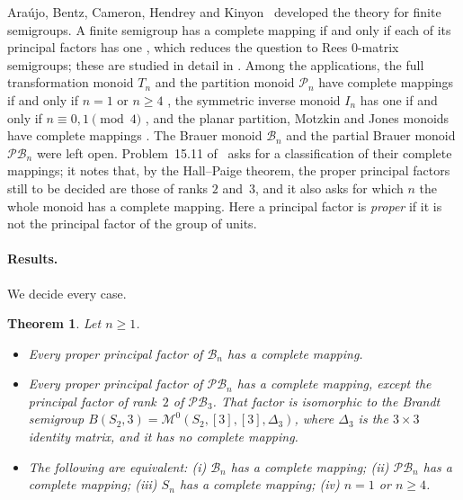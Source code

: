 \documentclass[11pt]{article}
\newtheorem{theorem}{Theorem}[section]
\theoremstyle{remark}
\newcommand{\B}{\mathcal B}
\newcommand{\PB}{\mathcal{PB}}
\newcommand{\M}{\mathcal M}
\begin{document}
Ara\'ujo, Bentz, Cameron, Hendrey and Kinyon~\cite{abchk} developed the theory
for finite semigroups. A finite semigroup has a complete mapping if and only
if each of its principal factors has one \cite[Theorem~4.4]{abchk}, which
reduces the question to Rees $0$-matrix semigroups; these are studied in
detail in \cite[Sections~6 and~7]{abchk}. Among the applications, the full
transformation monoid $T_n$ and the partition monoid $\mathcal P_n$ have
complete mappings if and only if $n=1$ or $n\ge4$
\cite[Theorems~9.16 and~8.5]{abchk}, the symmetric inverse monoid $I_n$ has one
if and only if $n\equiv0,1\pmod4$ \cite[Corollary~10.2]{abchk}, and the planar
partition, Motzkin and Jones monoids have complete mappings
\cite[Corollary~8.8]{abchk}. The Brauer monoid $\B_n$ and the partial Brauer
monoid $\PB_n$ were left open. Problem~15.11 of~\cite{abchk} asks for a
classification of their complete mappings; it notes that, by the Hall--Paige
theorem, the proper principal factors still to be decided are those of ranks
$2$ and~$3$, and it also asks for which $n$ the whole monoid has a complete
mapping. Here a principal factor is \emph{proper} if it is not the principal
factor of the group of units.

\paragraph{Results.}
We decide every case.

\begin{theorem}\label{thm:main}
Let $n\ge1$.
\begin{itemize}
\item[(a)] Every proper principal factor of $\B_n$ has a complete mapping.
\item[(b)] Every proper principal factor of $\PB_n$ has a complete mapping,
 except the principal factor of rank~$2$ of $\PB_3$. That factor is isomorphic
 to the Brandt semigroup $B(S_2,3)=\M^0(S_2,[3],[3],\Delta_3)$, where
 $\Delta_3$ is the $3\times3$ identity matrix, and it has no complete mapping.
\item[(c)] The following are equivalent: (i) $\B_n$ has a complete mapping;
 (ii) $\PB_n$ has a complete mapping; (iii) $S_n$ has a complete mapping;
 (iv) $n=1$ or $n\ge4$.
\end{itemize}
\end{theorem}
\end{document}
